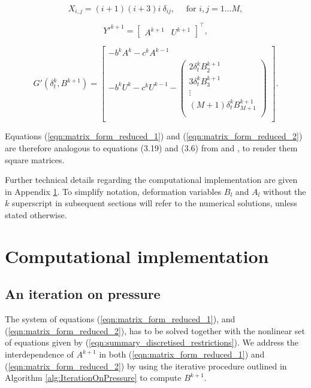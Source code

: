 \documentclass{jfm}
\begin{document}
\begin{equation}
     X_{i, j} =  (i+1)(i+3)i \ \delta_{ij}
             , \quad \text{ for } i, j = 1 \dots M,
 \end{equation}
 
  \begin{equation}
     Y'^{k+1} = 
     \left[
     \begin{array}{cc}
          A^{k+1} & U^{k+1}
     \end{array}
     \right]^{\top},
 \end{equation}
 


 \begin{equation}
     G'(\delta_t^k, B^{k+1}) =
     \left[
     \begin{array}{c}
          - b^k A^{k} - c^k A^{k-1} \\
          -b^k U^{k} - c^k U^{k-1}  - 
          \left(\begin{array}{c}
               2\delta_t^k B^{k+1}_2  \\
               3\delta_t^k B^{k+1}_3  \\
               \vdots \\
               (M+1)\delta_t^k B^{k+1}_{M+1}  \\
          \end{array}
          \right) \\
     \end{array}
     \right].
 \end{equation}

Equations (\ref{eqn:matrix_form_reduced_1}) and (\ref{eqn:matrix_form_reduced_2}) are therefore analogous to equations (3.19) and (3.6) from \cite{AgueroEtAl2022} and \cite{GaleanoRiosEtAl2017}, to render them square matrices. 

Further technical details regarding the computational implementation are given in Appendix \ref{sec:comp_implementation}. To simplify notation, deformation variables $B_l$ and $A_l$  without the $k$ superscript in subsequent sections will refer to the numerical solutions, unless stated otherwise.


\section{Computational implementation} \label{sec:comp_implementation}

\subsection{An iteration on pressure}
\label{sec:iteration_pressure}
The system of equations (\ref{eqn:matrix_form_reduced_1}), and (\ref{eqn:matrix_form_reduced_2}), has to be solved together with the nonlinear set of equations given by (\ref{eqn:summary_discretised_restrictions}). We address the interdependence of $A^{k+1}$ in both (\ref{eqn:matrix_form_reduced_1}) and (\ref{eqn:matrix_form_reduced_2}) by using the iterative procedure outlined in Algorithm \ref{alg:IterationOnPressure} to compute $B^{k+1}$.
\end{document}
